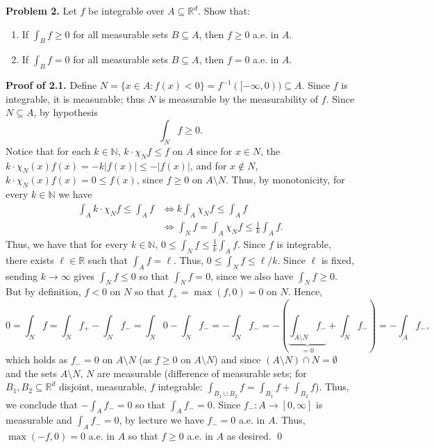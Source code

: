 \noindent \textbf{Problem 2.} Let \( f \) be integrable over \( A \subseteq \mathbb{R}^{d}  \). Show that:
\begin{enumerate}
	\item If \( \int_{B} f \geq 0 \) for all measurable sets \( B \subseteq A \), then \( f \geq 0  \) a.e. in \( A \).
	\item If \( \int_{B} f = 0  \) for all measurable sets \( B \subseteq A \), then \( f = 0 \) a.e. in \( A \).
\end{enumerate}
\noindent \textbf{Proof of 2.1.} Define \( N = \{ x \in A : f(x) < 0 \} = f ^{-1} ([-\infty,0))  \subseteq A\). Since \( f \) is integrable, it is measurable; thus \( N \) is measurable by the measurability of \( f \). Since \( N \subseteq A \), by hypothesis \[\int_{N} f \geq 0.\] Notice that for each \( k \in \mathbb{N}  \), \( k\cdot\chi_{N} f \leq f \) on \( A \) since for \( x \in N \), the \( k\cdot \chi_{N}(x) f(x) = -k |f(x)| \leq - |f(x)|\), and for \( x \notin N \), \( k\cdot \chi_{N} (x) f(x) = 0 \leq f(x) \), since \( f \geq 0 \) on \( A \setminus N \). Thus, by monotonicity, for every \( k \in \mathbb{N}  \) we have
\begin{align*}
	\int_{A} k \cdot \chi_{N} f \leq \int_{A} f &\iff k \int_{A} \chi_{N} f \leq \int_{A} f \tag{by linearity} \\
						    &\iff \int_{N} f = \int_{A} \chi_{N} f \leq \frac{1}{k} \int_{A} f.
\end{align*}
Thus, we have that for every \( k \in \mathbb{N} \), \( 0 \leq \int_{N} f \leq \frac{1}{k} \int_{A} f \). Since \(f \) is integrable, there exists \( \ell \in \mathbb{R} \) such that \( \int_{A} f = \ell. \) Thus, \( 0 \leq \int_{N} f \leq \ell / k \). Since \( \ell \) is fixed, sending \( k \to \infty \) gives \( \int_{N} f \leq 0 \) so that \( \int_{N} f = 0 \), since we also have \( \int_{N} f \geq 0 \). But by definition, \( f < 0 \) on \( N \) so that \( f_{+} = \max(f,0) = 0 \) on \( N \). Hence, \[0 = \int_{N} f = \int_{N} f_{+} - \int_{N} f_{-} = \int_{N} 0  - \int_{N} f_{-} = -\int_{N} f_{-}  = - \left ( {\underbrace{\int_{A \setminus N} f_{-}}_{=0}   + \int_{N} f_{-} } \right ) = -\int_{A} f_{-},\] which holds as \( f_{-} = 0 \) on \( A \setminus N \) (as \( f \geq 0 \) on \( A \setminus N \)) and since \( (A \setminus N) \cap N = \emptyset  \) and the sets \( A \setminus N \), \( N \) are measurable (difference of measurable sets; for \( B_1,B_2\subseteq \mathbb{R}^{d}  \) disjoint, measurable, \( f \) integrable: \( \int_{B_1\cup B_2} f = \int_{B_1} f+ \int_{B_2} f \)). Thus, we conclude that \( -\int_{A} f_{-} = 0 \) so that \( \int_{A} f_{-} = 0 \). Since \( f_{-} : A \to [0,\infty] \) is measurable and \( \int_{A} f_{-} = 0 \), by lecture we have \( f_{-} = 0 \) a.e. in \( A \). Thus, \( \max(-f, 0) = 0 \) a.e. in \( A \) so that \( f \geq 0 \) a.e. in \( A \) as desired. \qed

